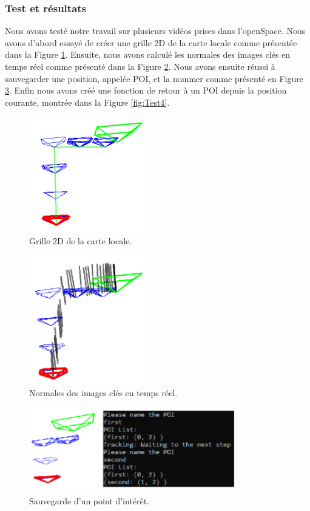 \documentclass[11pt]{article}
\begin{document}
      \subsubsection{Test et résultats}
        Nous avons testé notre travail sur plusieurs vidéos prises dans l'openSpace. Nous avons d'abord essayé de créer une grille 2D de la 
        carte locale comme présentée dans la Figure \ref{fig:Test1}. Ensuite, nous avons calculé les normales des images clés en temps réel 
        comme présenté dans la Figure \ref{fig:Test2}. Nous avons ensuite réussi à sauvegarder une position, appelée POI, et la nommer comme
        présenté en Figure \ref{fig:Test3}. Enfin nous avons créé une fonction de retour à un POI depuis la position courante, montrée dans la 
        Figure \ref{fig:Test4}.

        \begin{figure}[hbt]  
          \centering
          \includegraphics[width=50mm]{Test1.png}    
          \caption{Grille 2D de la carte locale.}
          \label{fig:Test1}
        \end{figure} 

        \begin{figure}[hbt]  
          \centering
          \includegraphics[width=50mm]{Test2.png}    
          \caption{Normales des images clés en temps réel.}
          \label{fig:Test2}
        \end{figure} 

        \begin{figure}[hbt]  
          \centering
          \includegraphics[width=90mm]{Test3.png}    
          \caption{Sauvegarde d'un point d'intérêt.}
          \label{fig:Test3}
        \end{figure} 
\end{document}
